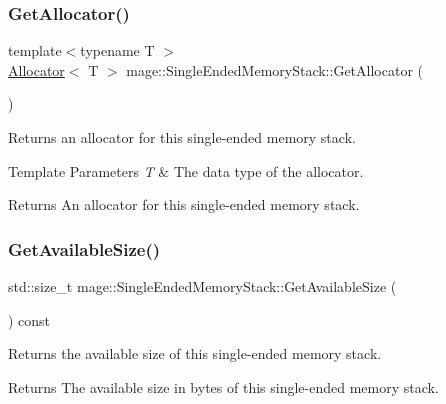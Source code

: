\subsubsection{\texorpdfstring{Get\+Allocator()}{GetAllocator()}}
{\footnotesize\ttfamily template$<$typename T $>$ \\
\mbox{\hyperlink{classmage_1_1_single_ended_memory_stack_1_1_allocator}{Allocator}}$<$ T $>$ mage\+::\+Single\+Ended\+Memory\+Stack\+::\+Get\+Allocator (\begin{DoxyParamCaption}{ }\end{DoxyParamCaption})\hspace{0.3cm}{\ttfamily [noexcept]}}

Returns an allocator for this single-\/ended memory stack.


\begin{DoxyTemplParams}{Template Parameters}
{\em T} & The data type of the allocator. \\
\hline
\end{DoxyTemplParams}
\begin{DoxyReturn}{Returns}
An allocator for this single-\/ended memory stack. 
\end{DoxyReturn}
\mbox{\label{classmage_1_1_single_ended_memory_stack_a722743b5b9a94b60a375a71027bb70a5}} 
\subsubsection{\texorpdfstring{Get\+Available\+Size()}{GetAvailableSize()}}
{\footnotesize\ttfamily std\+::size\+\_\+t mage\+::\+Single\+Ended\+Memory\+Stack\+::\+Get\+Available\+Size (\begin{DoxyParamCaption}{ }\end{DoxyParamCaption}) const\hspace{0.3cm}{\ttfamily [noexcept]}}

Returns the available size of this single-\/ended memory stack.

\begin{DoxyReturn}{Returns}
The available size in bytes of this single-\/ended memory stack. 
\end{DoxyReturn}
\mbox{\label{classmage_1_1_single_ended_memory_stack_a2924fbd6ee4a3f3cd82626f6a311991e}} 
